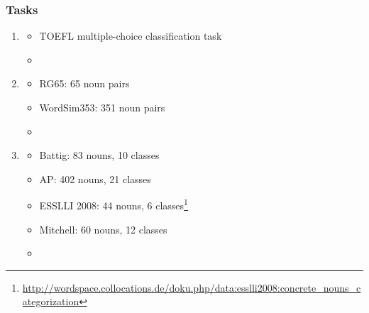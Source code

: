 \documentclass[t]{beamer} %
\begin{document}
\begin{frame}
  \frametitle{Tasks}

  \begin{enumerate}
  \item {}
    \begin{itemize}
    \item TOEFL multiple-choice classification task \citep{Landauer:Dumais:97}
    \item[]
    \end{itemize}
  \item {}
    \begin{itemize}
    \item RG65: 65 noun pairs \citep{Rubenstein:Goodenough:65}
    \item WordSim353: 351 noun pairs \citep{Finkelstein:etc:02}
    \item[]
    \end{itemize}  
  \item {} 
    \begin{itemize} 
    \item Battig: 83 nouns, 10 classes \citep{VanOverschelde:Rawson:Dunlosky:04}
    \item AP: 402 nouns, 21 classes \citep{Almuhareb:06}
    \item ESSLLI 2008: 44 nouns, 6 classes\footnote{\scriptsize\url{http://wordspace.collocations.de/doku.php/data:esslli2008:concrete_nouns_categorization}}
    \item Mitchell: 60 nouns, 12 classes \citep{Mitchell:etc:08}
    \item[]
    \end{itemize}   
  \end{enumerate}
\end{frame}
\end{document}

